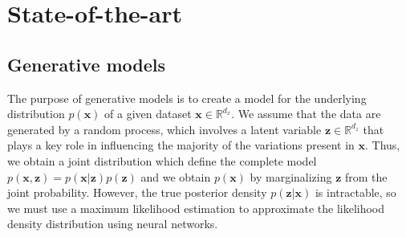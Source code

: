 \documentclass{article}
\begin{document}




\section{State-of-the-art}


\subsection{Generative models}


The purpose of generative models is to create a model for the underlying distribution $p(\textbf{x})$ of a given dataset $\textbf{x} \in \mathbb{R}^{d_x}$. We assume that the data are generated by a random process, which involves a latent variable $\textbf{z} \in \mathbb{R}^{d_z}$ that plays a key role in influencing the majority of the variations present in $\textbf{x}$. Thus, we obtain a joint distribution which define the complete model $p(\textbf{x}, \textbf{z}) = p(\textbf{x}|\textbf{z})p(\textbf{z})$ and we obtain $p(\textbf{x})$ by marginalizing $\textbf{z}$ from the joint probability. 
However, the true posterior density $p(\textbf{z}|\textbf{x})$ is intractable, so
we must use a maximum likelihood estimation to approximate the likelihood density distribution using neural networks.
\end{document}
